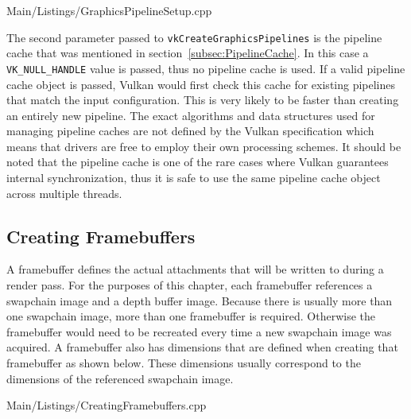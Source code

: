       
      {Main/Listings/GraphicsPipelineSetup.cpp}

      The second parameter passed to \lstinline{vkCreateGraphicsPipelines} is the pipeline cache that was mentioned in section~\ref{subsec:PipelineCache}.
      In this case a \lstinline{VK_NULL_HANDLE} value is passed, thus no pipeline cache is used.
      If a valid pipeline cache object is passed, Vulkan would first check this cache for existing pipelines that match the input configuration.
      This is very likely to be faster than creating an entirely new pipeline.
      The exact algorithms and data structures used for managing pipeline caches are not defined by the Vulkan specification which means that \glspl{driver} are free to employ their own processing schemes.
      It should be noted that the pipeline cache is one of the rare cases where Vulkan guarantees internal synchronization, thus it is safe to use the same pipeline cache object across multiple threads.


    \subsection{Creating Framebuffers}
    \label{subsec:CreatingFramebuffers}
      A framebuffer defines the actual attachments that will be written to during a render pass.
      For the purposes of this chapter, each framebuffer references a swapchain image and a depth buffer image.
      Because there is usually more than one swapchain image, more than one framebuffer is required.
      Otherwise the framebuffer would need to be recreated every time a new swapchain image was acquired.
      A framebuffer also has dimensions that are defined when creating that framebuffer as shown below.
      These dimensions usually correspond to the dimensions of the referenced swapchain image.

      
      {Main/Listings/CreatingFramebuffers.cpp}

